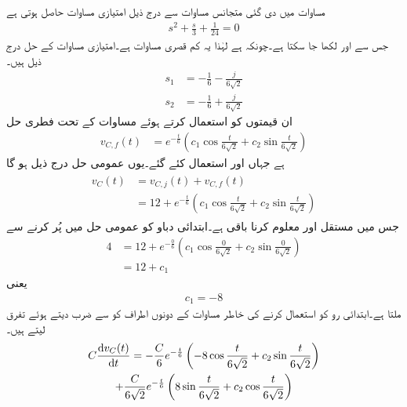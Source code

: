 مساوات  میں دی گئی متجانس مساوات سے درج ذیل امتیازی مساوات حاصل ہوتی ہے
\begin{align*}
s^2+\frac{s}{3}+\frac{1}{24}=0
\end{align*}
جس سے  اور  لکھا جا سکتا ہے۔چونکہ  ہے لہٰذا یہ کم قصری مساوات ہے۔امتیازی مساوات کے حل درج ذیل ہیں۔
\begin{align*}
s_1&=-\frac{1}{6}-\frac{j}{6\sqrt{2}}\\
s_2&=-\frac{1}{6}+\frac{j}{6\sqrt{2}}
\end{align*}
ان قیمتوں کو استعمال کرتے ہوئے  مساوات  کے تحت فطری حل
\begin{align*}
v_{C,f}(t)&=e^{-\frac{t}{6}}\left(c_1 \cos \frac{t}{6\sqrt{2}}+c_2 \sin \frac{t}{6\sqrt{2}}\right)
\end{align*}
ہے جہاں  اور  استعمال کئے گئے۔یوں عمومی حل درج ذیل ہو گا
\begin{gather}
\begin{aligned}\label{مساوات_عارضی_سلسلہ_وار_مکمل_حل_الف}
v_C(t)&=v_{C,j}(t)+v_{C,f}(t)\\
&=12+e^{-\frac{t}{6}}\left(c_1 \cos \frac{t}{6\sqrt{2}}+c_2 \sin \frac{t}{6\sqrt{2}}\right)
\end{aligned}
\end{gather}
جس میں مستقل  اور  معلوم کرنا باقی ہے۔ابتدائی دباو  کو عمومی حل میں پُر کرنے سے
\begin{align*}
4&=12+e^{-\frac{0}{6}}\left(c_1 \cos \frac{0}{6\sqrt{2}}+c_2 \sin \frac{0}{6\sqrt{2}}\right)\\
&=12+c_1
\end{align*}
یعنی
\begin{align}\label{مساوات_عارضی_مستقل_الف}
c_1=-8
\end{align}
ملتا ہے۔ابتدائی رو  کو استعمال کرنے کی خاطر مساوات  کے دونوں اطراف کو  سے ضرب دیتے ہوئے تفرق لیتے ہیں۔
\begin{multline*}
C \frac{\dif v_C(t)}{\dif t}=-\frac{C}{6}e^{-\frac{t}{6}}\left(-8 \cos \frac{t}{6\sqrt{2}}+c_2 \sin \frac{t}{6\sqrt{2}}\right)\\+\frac{C}{6\sqrt{2}}e^{-\frac{t}{6}}\left(8 \sin \frac{t}{6\sqrt{2}}+c_2 \cos \frac{t}{6\sqrt{2}}\right)
\end{multline*}
